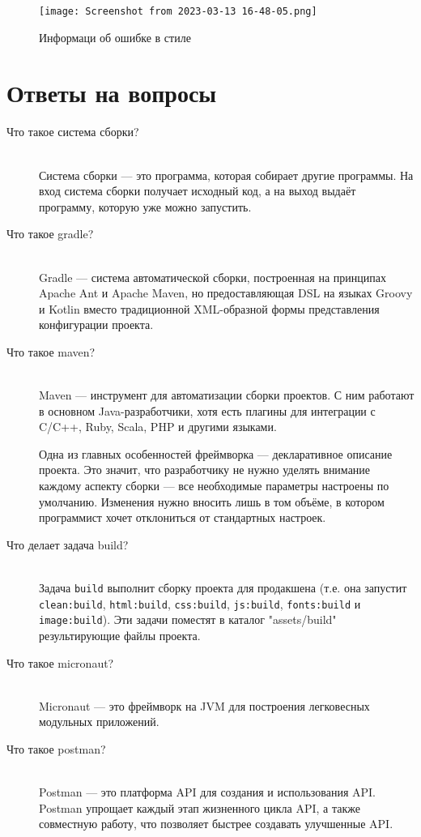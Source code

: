 \begin{figure}[h!tp]
	\centering
	\texttt{[image: Screenshot from 2023-03-13 16-48-05.png]}
	\caption{Информаци об ошибке в стиле}
	\label{fig:gradle:checkstyle:rep:f}
\end{figure}

\clearpage

\section*{Ответы на вопросы}

\begin{description}
	\item[Что такое система сборки?]\mbox{}\\
		Система сборки --- это программа, которая собирает другие программы.
		На вход система сборки получает исходный код, а на выход выдаёт
		программу, которую уже можно запустить.
	\item[Что такое gradle?]\mbox{}\\
		Gradle --- система автоматической сборки, построенная на принципах
		Apache Ant и Apache Maven, но предоставляющая DSL на языках
		Groovy и Kotlin вместо традиционной XML-образной формы представления
		конфигурации проекта.
	\item[Что такое maven?]\mbox{}\\
		Maven --- инструмент для автоматизации сборки проектов.
		С ним работают в основном Java-разработчики, хотя есть плагины
		для интеграции с C/C++, Ruby, Scala, PHP и другими языками.\par
		Одна из главных особенностей фреймворка --- декларативное описание
		проекта. Это значит, что разработчику не нужно уделять внимание
		каждому аспекту сборки --- все необходимые параметры настроены
		по умолчанию. Изменения нужно вносить лишь в том объёме,
		в котором программист хочет отклониться от стандартных настроек.
	\item[Что делает задача build?]\mbox{}\\
		Задача \texttt{build} выполнит сборку проекта для продакшена
		(т.е. она запустит \texttt{clean:build}, \texttt{html:build},
		\texttt{css:build}, \texttt{js:build}, \texttt{fonts:build}
		и \texttt{image:build}). Эти задачи поместят
		в каталог "assets/build" результирующие файлы проекта.
	\item[Что такое micronaut?]\mbox{}\\
		Micronaut --- это фреймворк на JVM для построения легковесных
		модульных приложений.
	\item[Что такое postman?]\mbox{}\\
		Postman --- это платформа API для создания и использования API.
		Postman упрощает каждый этап жизненного цикла API, а также совместную
		работу, что позволяет быстрее создавать улучшенные API.
\end{description}

